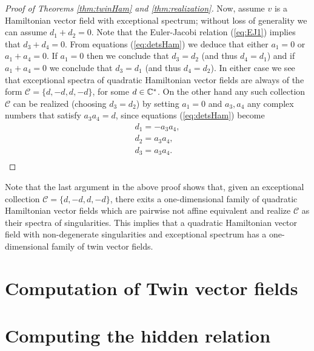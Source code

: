 \documentclass[phd,tocprelim]{cornell}
\begin{document}
\begin{proof}[Proof of Theorems \ref*{thm:twinHam} and \ref*{thm:realization}]
\medskip
Now, assume $v$ is a Hamiltonian vector field with exceptional spectrum; without loss of generality we can assume $d_1+d_2=0$. Note that the Euler-Jacobi relation (\ref{eq:EJ1}) implies that $d_3+d_4=0$. From equations (\ref{eq:detsHam}) we deduce that either $a_1=0$ or $a_1+a_4=0$. If $a_1=0$ then we conclude that $d_3=d_2$ (and thus $d_4=d_1$) and if $a_1+a_4=0$ we conclude that $d_3=d_1$ (and thus $d_4=d_2$). In either case we see that exceptional spectra of quadratic Hamiltonian vector fields are always of the form $\mathcal{C}=\{d,-d,d,-d\}$, for some $d\in\mathbb{C}^{\ast}$. On the other hand any such collection $\mathcal{C}$ can be realized (choosing $d_3=d_2$) by setting $a_1=0$ and $a_3,a_4$ any complex numbers that satisfy $a_3a_4=d$, since equations (\ref{eq:detsHam}) become
\begin{equation*}
\begin{array}{l} 
d_1 = -a_3a_4, \\
d_2 = a_3a_4, \\
d_3 = a_3a_4. \\
\end{array}
\end{equation*}
\end{proof}

Note that the last argument in the above proof shows that, given an exceptional collection $\mathcal{C}=\{d,-d,d,-d\}$, there exits a one-dimensional family of quadratic Hamiltonian vector fields which are pairwise not affine equivalent and realize $\mathcal{C}$ as their spectra of singularities. This implies that a quadratic Hamiltonian vector field with non-degenerate singularities and exceptional spectrum has a one-dimensional family of twin vector fields.










\chapter{Computation of Twin vector fields}\label{chpt:appendix:twins}











\chapter{Computing the hidden relation}\label{chpt:appendix:hiddenRelation}
\end{document}
